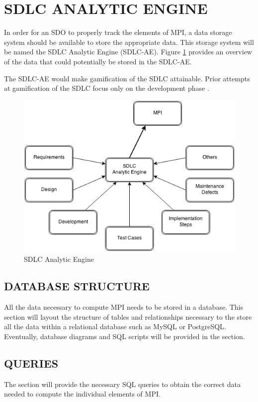 \documentclass[SDSUThesis.tex]{subfiles}
\begin{document}
\section{SDLC ANALYTIC ENGINE}

In order for an SDO to properly track the elements of MPI, a data storage system should be available to store the appropriate data.   This storage system will be named the SDLC Analytic Engine (SDLC-AE). Figure \ref{fig:sdlc-ae} provides an overview of the data that could potentially be stored in the SDLC-AE.

The SDLC-AE would make gamification of the SDLC attainable.  Prior attempts
at gamification of the SDLC focus only on the development phase \cite{Dubois2013} \cite{Snipes2013}.

\begin{figure}[ht]
\includegraphics[scale=.7]{images/sdlc-ae.png}
\caption{SDLC Analytic Engine}
\label{fig:sdlc-ae}
\end{figure}

\subsection{DATABASE STRUCTURE}
   All the data necessary to compute MPI needs to be stored in a database.  This section will 
   layout the structure of tables and relationships necessary to the store all the data
   within a relational database such as MySQL or PostgreSQL.  Eventually,
   database diagrams and SQL scripts will be provided in the section.

\subsection{QUERIES}
    The section will provide the necessary SQL queries to obtain the correct data
    needed to compute the individual elements of MPI.
    
\end{document}
